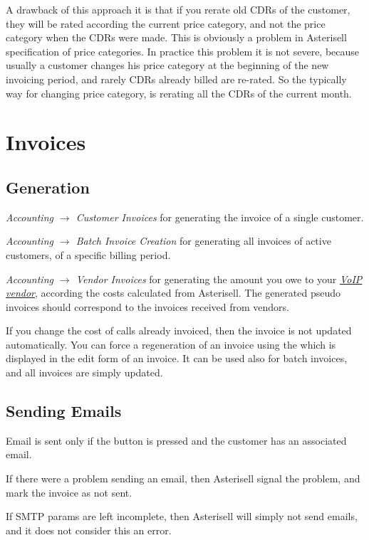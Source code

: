 \documentclass[letterpaper,10pt,english]{sphinxmanual}
\begin{document}
A drawback of this approach it is that if you rerate old CDRs of the customer, they will be rated according the current price category, and not the price category when the CDRs were made. This is obviously a problem in Asterisell specification of price categories. In practice this problem it is not severe, because usually a customer changes his price category at the beginning of the new invoicing period, and rarely CDRs already billed are re-rated. So the typically way for changing price category, is rerating all the CDRs of the current month.


\section{Invoices}
\label{index:invoices}

\subsection{Generation}
\label{index:generation}
\emph{Accounting \(\rightarrow\) Customer Invoices} for generating the invoice of a single customer.

\emph{Accounting \(\rightarrow\) Batch Invoice Creation} for generating all invoices of active customers, of a specific billing period.

\emph{Accounting \(\rightarrow\) Vendor Invoices} for generating the amount you owe to your {\hyperref[index:term-voip-vendor]{\emph{VoIP vendor}}}, according the costs calculated from Asterisell. The generated pseudo invoices should correspond to the invoices received from vendors.

If you change the cost of calls already invoiced, then the invoice is not updated automatically. You can force a regeneration of an invoice using the  which is displayed in the edit form of an invoice. It can be used also for batch invoices, and all invoices are simply updated.


\subsection{Sending Emails}
\label{index:sending-emails}
Email is sent only if the  button is pressed and the customer has an associated email.

If there were a problem sending an email, then Asterisell signal the problem, and mark the invoice as not sent.

If SMTP params are left incomplete, then Asterisell will simply not send emails, and it does not consider this an error.
\end{document}
